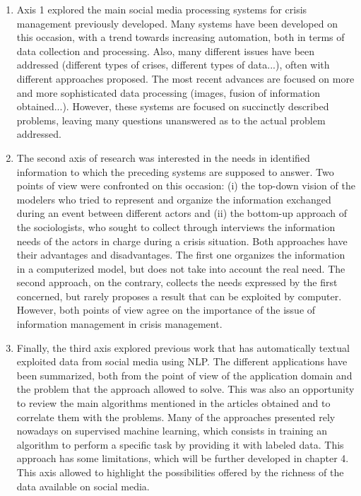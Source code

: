 \begin{enumerate}
    \item Axis 1 explored the main social media processing systems for crisis management previously developed.
          Many systems have been developed on this occasion, with a trend towards increasing automation, both in terms of data collection and processing.
          Also, many different issues have been addressed (different types of crises, different types of data...), often with different approaches proposed.
          The most recent advances are focused on more and more sophisticated data processing (images, fusion of information obtained...).
          However, these systems are focused on succinctly described problems, leaving many questions unanswered as to the actual problem addressed.
    \item The second axis of research was interested in the needs in identified information to which the preceding systems are supposed to answer.
          Two points of view were confronted on this occasion: (i) the top-down vision of the modelers who tried to represent and organize the information exchanged during an event between different actors and
          (ii) the bottom-up approach of the sociologists, who sought to collect through interviews the information needs of the actors in charge during a crisis situation.
          Both approaches have their advantages and disadvantages. The first one organizes the information in a computerized model, but does not take into account the real need.
          The second approach, on the contrary, collects the needs expressed by the first concerned, but rarely proposes a result that can be exploited by computer.
          However, both points of view agree on the importance of the issue of information management in crisis management.
    \item Finally, the third axis explored previous work that has automatically textual exploited data from social media using NLP.
          The different applications have been summarized, both from the point of view of the application domain and the problem that the approach allowed to solve.
          This was also an opportunity to review the main algorithms mentioned in the articles obtained and to correlate them with the problems.
          Many of the approaches presented rely nowadays on supervised machine learning, which consists in training an algorithm to perform a specific task by providing it with labeled data.
          This approach has some limitations, which will be further developed in chapter 4.
          This axis allowed to highlight the possibilities offered by the richness of the data available on social media.
\end{enumerate}

